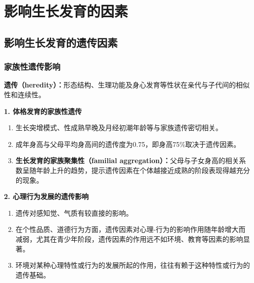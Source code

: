 \chapter{影响生长发育的因素}
\setcounter{chapter}{2}

\section{影响生长发育的遗传因素}\difficulty

\subsection{家族性遗传影响}

\begin{defbox}
\textbf{遗传（heredity）：}形态结构、生理功能及身心发育等性状在亲代与子代间的相似性和连续性。
\end{defbox}

\begin{keybox}
\textbf{1. 体格发育的家族性遗传}
\begin{enumerate}[leftmargin=*]
    \item 生长突增模式、性成熟早晚及月经初潮年龄等与家族遗传密切相关。
    \item 成年身高与父母平均身高间的遗传度为0.75，即身高75\%取决于遗传因素。
    \item \textbf{生长发育的家族聚集性（familial aggregation）：}父母与子女身高的相关系数呈随年龄上升的趋势，提示遗传因素在个体越接近成熟的阶段表现得越充分的现象。
\end{enumerate}

\textbf{2. 心理行为发展的遗传影响}
\begin{enumerate}[leftmargin=*]
    \item 遗传对感知觉、气质有较直接的影响。
    \item 在个性品质、道德行为方面，遗传因素对心理-行为的影响作用随年龄增大而减弱，尤其在青少年阶段，遗传因素的作用远不如环境、教育等因素的影响显著。
    \item 环境对某种心理特性或行为的发展所起的作用，往往有赖于这种特性或行为的遗传基础。
\end{enumerate}
\end{keybox}

